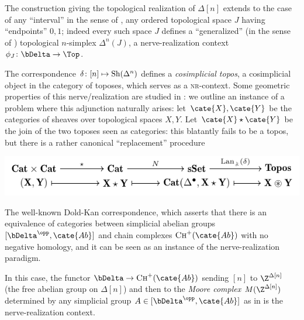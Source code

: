 \begin{example}\label{mordicchio}
The construction giving the topological realization of $\Delta[n]$ extends to the case of any ``interval'' in the sense of \cite[\S \textbf{III.1}]{Moe}, \ie any ordered topological space $J$ having ``endpoints'' $0,1$; indeed every such space $J$ defines a ``generalized'' (in the sense of \cite[\S \textbf{III.1}]{Moe}) topological $n$-simplex $\Delta^n{(J)}$, \ie a nerve\hyp{}realization context $\phi_J\colon \bDelta\to \Top$.
\end{example} 
\begin{example}\label{toposophic}
The correspondence $\delta\colon [n]\mapsto {\rm Sh}(\Delta^n)$ defines a \emph{cosimplicial topos}, \ie a cosimplicial object in the category of toposes, which serves as a \textsc{nr}-context. Some geometric properties of this nerve/realization are studied in \cite[\S \textbf{III}]{Moe}: we outline an instance of a problem where this adjunction naturally arises: let $\cate{X}, \cate{Y}$ be the categories of sheaves over topological spaces $X,Y$. Let $\cate{X}\star \cate{Y}$ be the join of the two toposes seen as categories: this blatantly fails to be a topos, but there is a rather canonical ``replacement'' procedure 
\begin{center}
\includegraphics[scale=1]{figures/fig1}
\end{center}
\end{example}
\begin{example} 
The well-known Dold-Kan correspondence, which asserts that there is an equivalence of categories between simplicial abelian groups $[\bDelta^\opp,\cate{Ab}]$ and chain complexes $\textsc{Ch}^+(\cate{Ab})$ with no negative homology, and it can be seen as an instance of the nerve\hyp{}realization paradigm.

In this case, the functor $\bDelta\to \textsc{Ch}^+(\cate{Ab})$ sending $[n]$ to $\Z^{\Delta[n]}$ (the free abelian group on $\Delta[n]$) and then to the \emph{Moore complex} $M(\Z^{\Delta[n]})$ determined by any simplicial group $A\in [\bDelta^\opp,\cate{Ab}]$ as in \cite{GoJ} is the nerve\hyp{}realization context.
\end{example}
